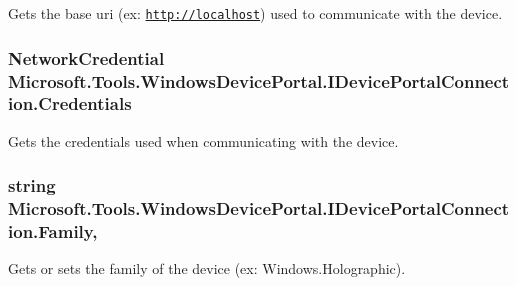 Gets the base uri (ex\+: \href{http://localhost}{\tt http\+://localhost}) used to communicate with the device. 

\subsubsection[{\texorpdfstring{Credentials}{Credentials}}]{\setlength{\rightskip}{0pt plus 5cm}Network\+Credential Microsoft.\+Tools.\+Windows\+Device\+Portal.\+I\+Device\+Portal\+Connection.\+Credentials\hspace{0.3cm}{\ttfamily [get]}}\hypertarget{interface_microsoft_1_1_tools_1_1_windows_device_portal_1_1_i_device_portal_connection_a1df2b17dbb264c11c38fe5ef50c2fa2c}{}\label{interface_microsoft_1_1_tools_1_1_windows_device_portal_1_1_i_device_portal_connection_a1df2b17dbb264c11c38fe5ef50c2fa2c}


Gets the credentials used when communicating with the device. 

\subsubsection[{\texorpdfstring{Family}{Family}}]{\setlength{\rightskip}{0pt plus 5cm}string Microsoft.\+Tools.\+Windows\+Device\+Portal.\+I\+Device\+Portal\+Connection.\+Family\hspace{0.3cm}{\ttfamily [get]}, {\ttfamily [set]}}\hypertarget{interface_microsoft_1_1_tools_1_1_windows_device_portal_1_1_i_device_portal_connection_abd1b399569dab868e0631a6f205b31e8}{}\label{interface_microsoft_1_1_tools_1_1_windows_device_portal_1_1_i_device_portal_connection_abd1b399569dab868e0631a6f205b31e8}


Gets or sets the family of the device (ex\+: Windows.\+Holographic). 

